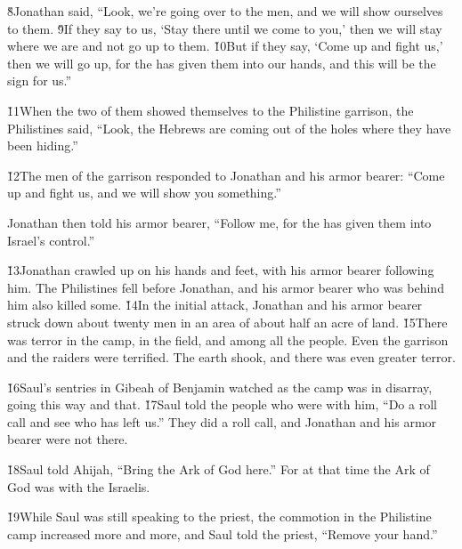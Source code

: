 \v{8}Jonathan said, ``Look, we're going over to the men, and we will show ourselves to them. \v{9}If they say to us, `Stay there until we come to you,' then we will stay where we are and not go up to them. \v{10}But if they say, `Come up and fight us,' then we will go up, for the  has given them into our hands, and this will be the sign for us.''

\v{11}When the two of them showed themselves to the Philistine garrison, the Philistines said, ``Look, the Hebrews are coming out of the holes where they have been hiding.''

\v{12}The men of the garrison responded to Jonathan and his armor bearer: ``Come up and fight us, and we will show you something.''

Jonathan then told his armor bearer, ``Follow me, for the  has given them into Israel's control.''

\v{13}Jonathan crawled up on his hands and feet, with his armor bearer following him. The Philistines fell before Jonathan, and his armor bearer who was behind him also killed some. \v{14}In the initial attack, Jonathan and his armor bearer struck down about twenty men in an area of about half an acre of land. \v{15}There was terror in the camp, in the field, and among all the people. Even the garrison and the raiders were terrified. The earth shook, and there was even greater terror.

\v{16}Saul's sentries in Gibeah of Benjamin watched as the camp was in disarray, going this way and that. \v{17}Saul told the people who were with him, ``Do a roll call and see who has left us.'' They did a roll call, and Jonathan and his armor bearer were not there.

\v{18}Saul told Ahijah, ``Bring the Ark of God here.'' For at that time the Ark of God was with the Israelis.

\v{19}While Saul was still speaking to the priest, the commotion in the Philistine camp increased more and more, and Saul told the priest, ``Remove your hand.''

